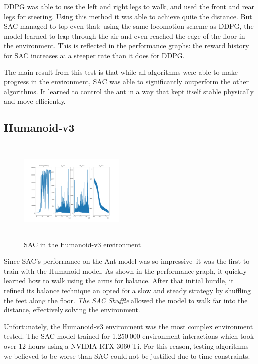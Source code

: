 \documentclass[conference]{IEEEtran}
\begin{document}
DDPG was able to use the left and right legs to walk, and used the front and rear legs for steering. Using this method it was able to achieve quite the distance. But SAC managed to top even that; using the same locomotion scheme as DDPG, the model learned to leap through the air and even reached the edge of the floor in the environment. This is reflected in the performance graphs: the reward history for SAC increases at a steeper rate than it does for DDPG.

The main result from this test is that while all algorithms were able to make progress in the environment, SAC was able to significantly outperform the other algorithms. It learned to control the ant in a way that kept itself stable physically and move efficiently.

\subsection{Humanoid-v3}

\begin{figure}
    \includegraphics[width=0.45\textwidth, height=5cm]{sac-humanoid}
    \caption{SAC in the Humanoid-v3 environment}
\end{figure}

Since SAC's performance on the Ant model was so impressive, it was the first to train with the Humanoid model. As shown in the performance graph, it quickly learned how to walk using the arms for balance. After that initial hurdle, it refined its balance technique an opted for a slow and steady strategy by shuffling the feet along the floor. \textit {The SAC Shuffle} allowed the model to walk far into the distance, effectively solving the environment.

Unfortunately, the Humanoid-v3 environment was the most complex environment tested. The SAC model trained for 1,250,000 environment interactions which took over 12 hours using a NVIDIA RTX 3060 Ti. For this reason, testing algorithms we believed to be worse than SAC could not be justified due to time constraints.
\end{document}
